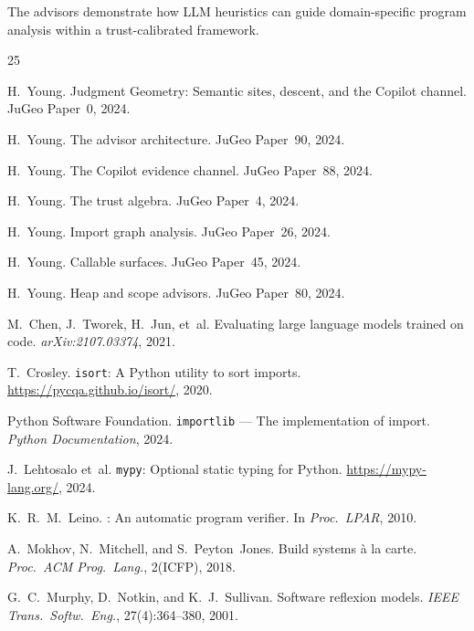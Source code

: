 \documentclass[11pt]{article}
\begin{document}
The advisors demonstrate how LLM heuristics can guide domain-specific
program analysis within a trust-calibrated framework.

\begin{thebibliography}{25}

H.~Young.
\newblock Judgment Geometry: Semantic sites, descent, and the Copilot channel.
\newblock JuGeo Paper~0, 2024.

H.~Young.
\newblock The advisor architecture.
\newblock JuGeo Paper~90, 2024.

H.~Young.
\newblock The Copilot evidence channel.
\newblock JuGeo Paper~88, 2024.

H.~Young.
\newblock The trust algebra.
\newblock JuGeo Paper~4, 2024.

H.~Young.
\newblock Import graph analysis.
\newblock JuGeo Paper~26, 2024.

H.~Young.
\newblock Callable surfaces.
\newblock JuGeo Paper~45, 2024.

H.~Young.
\newblock Heap and scope advisors.
\newblock JuGeo Paper~80, 2024.

M.~Chen, J.~Tworek, H.~Jun, et~al.
\newblock Evaluating large language models trained on code.
\newblock \emph{arXiv:2107.03374}, 2021.

T.~Crosley.
\newblock \texttt{isort}: A Python utility to sort imports.
\newblock \url{https://pycqa.github.io/isort/}, 2020.

Python Software Foundation.
\newblock \texttt{importlib} --- The implementation of import.
\newblock \emph{Python Documentation}, 2024.

J.~Lehtosalo et~al.
\newblock \texttt{mypy}: Optional static typing for Python.
\newblock \url{https://mypy-lang.org/}, 2024.

K.~R.~M.~Leino.
: An automatic program verifier.
\newblock In \emph{Proc.\ LPAR}, 2010.

A.~Mokhov, N.~Mitchell, and S.~Peyton~Jones.
\newblock Build systems \`a la carte.
\newblock \emph{Proc.\ ACM Prog.\ Lang.}, 2(ICFP), 2018.

G.~C.~Murphy, D.~Notkin, and K.~J.~Sullivan.
\newblock Software reflexion models.
\newblock \emph{IEEE Trans.\ Softw.\ Eng.}, 27(4):364--380, 2001.


\end{thebibliography}
\end{document}
